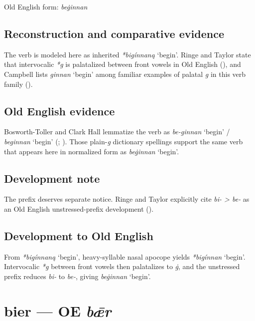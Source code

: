 \documentclass[
  british,
  a4paper,
  openany]{book}
\providecommand{\Recon}[1]{\emph{*#1}}
{\catcode`→=\active \global\def→{\ensuremath{\rightarrow}}}
\providecommand{\texorpdfstring}[2]{#1}
\providecommand{\Recon}[1]{\emph{*#1}}
{\catcode`→=\active \global\def→{\ensuremath{\rightarrow}}}
\begin{document}
Old English form: \emph{beġinnan}

\subsection{Reconstruction and comparative
evidence}\label{reconstruction-and-comparative-evidence-3}

The verb is modeled here as inherited {\Recon{bigínnaną} `begin'}. Ringe
and Taylor state that intervocalic \emph{*g} is palatalized between
front vowels in Old English (), and Campbell lists {\emph{ginnan}} `begin' among familiar
examples of palatal \emph{g} in this verb family
().

\subsection{Old English evidence}\label{old-english-evidence-3}

Bosworth-Toller and Clark Hall lemmatize the verb as {\emph{be-ginnan}}
`begin' / {\emph{beginnan}} `begin'
(;
). Those plain-\emph{g}
dictionary spellings support the same verb that appears here in
normalized form as {\emph{beġinnan}} `begin'.

\subsection{Development note}\label{development-note}

The prefix deserves separate notice. Ringe and Taylor explicitly cite
\emph{bi- \textgreater{} be-} as an Old English unstressed-prefix
development ().

\subsection{Development to Old
English}\label{development-to-old-english-3}

From {\Recon{bigínnaną} `begin'}, heavy-syllable nasal apocope yields
\Recon{bigínnan} `begin'. Intervocalic \emph{*g} between front vowels
then palatalizes to \emph{ġ}, and the unstressed prefix reduces
\emph{bi-} to \emph{be-}, giving {\emph{beġinnan}} `begin'.

\section{\texorpdfstring{bier --- OE
\emph{bǣr}}{bier --- OE bǣr}}\label{bier-oe-bux1e3r}
\end{document}
